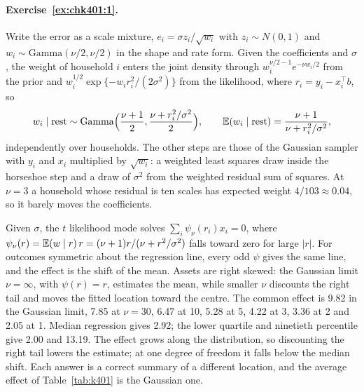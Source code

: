 \paragraph{Exercise~\ref{ex:chk401:1}.} Write the error as a scale mixture, $e_i = \sigma z_i/\sqrt{w_i}$ with $z_i \sim N(0, 1)$ and $w_i \sim \mathrm{Gamma}(\nu/2, \nu/2)$ in the shape and rate form. Given the coefficients and $\sigma$, the weight of household $i$ enters the joint density through $w_i^{\nu/2 - 1}e^{-\nu w_i/2}$ from the prior and $w_i^{1/2}\exp\{-w_i r_i^2/(2\sigma^2)\}$ from the likelihood, where $r_i = y_i - x_i^\top b$, so
\[
w_i \mid \text{rest} \sim \mathrm{Gamma}\Bigl(\frac{\nu + 1}{2}, \frac{\nu + r_i^2/\sigma^2}{2}\Bigr), \qquad \mathbb{E}(w_i \mid \text{rest}) = \frac{\nu + 1}{\nu + r_i^2/\sigma^2},
\]
independently over households. The other steps are those of the Gaussian sampler with $y_i$ and $x_i$ multiplied by $\sqrt{w_i}$: a weighted least squares draw inside the horseshoe step and a draw of $\sigma^2$ from the weighted residual sum of squares. At $\nu = 3$ a household whose residual is ten scales has expected weight $4/103 \approx 0.04$, so it barely moves the coefficients.

Given $\sigma$, the $t$ likelihood mode solves $\sum_i\psi_\nu(r_i)x_i = 0$, where $\psi_\nu(r) = \mathbb{E}(w \mid r)\,r = (\nu + 1)r/(\nu + r^2/\sigma^2)$ falls toward zero for large $|r|$. For outcomes symmetric about the regression line, every odd $\psi$ gives the same line, and the effect is the shift of the mean. Assets are right skewed: the Gaussian limit $\nu = \infty$, with $\psi(r) = r$, estimates the mean, while smaller $\nu$ discounts the right tail and moves the fitted location toward the centre. The common effect is 9.82 in the Gaussian limit, 7.85 at $\nu = 30$, 6.47 at 10, 5.28 at 5, 4.22 at 3, 3.36 at 2 and 2.05 at 1. Median regression gives 2.92; the lower quartile and ninetieth percentile give 2.00 and 13.19. The effect grows along the distribution, so discounting the right tail lowers the estimate; at one degree of freedom it falls below the median shift. Each answer is a correct summary of a different location, and the average effect of Table~\ref{tab:k401} is the Gaussian one.

